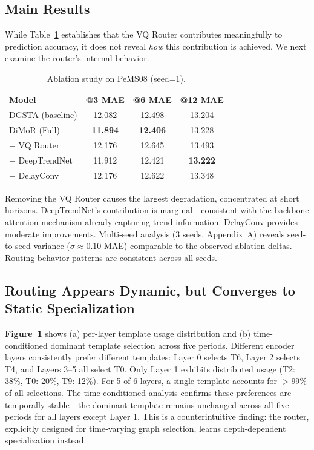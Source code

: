\documentclass[journal]{IEEEtran}
\begin{document}
\subsection{Main Results}

While Table~\ref{tab:ablation} establishes that the VQ Router contributes meaningfully to prediction accuracy, it does not reveal \emph{how} this contribution is achieved. We next examine the router's internal behavior.

\begin{table}[h]
\centering
\caption{Ablation study on PeMS08 (seed=1).}
\label{tab:ablation}
\begin{tabular}{lccc}
\toprule
Model & @3 MAE & @6 MAE & @12 MAE \\
\midrule
DGSTA (baseline) & 12.082 & 12.498 & 13.204 \\
DiMoR (Full) & \textbf{11.894} & \textbf{12.406} & 13.228 \\
$-$ VQ Router & 12.176 & 12.645 & 13.493 \\
$-$ DeepTrendNet & 11.912 & 12.421 & \textbf{13.222} \\
$-$ DelayConv & 12.176 & 12.622 & 13.348 \\
\bottomrule
\end{tabular}
\end{table}

Removing the VQ Router causes the largest degradation, concentrated at short horizons. DeepTrendNet's contribution is marginal---consistent with the backbone attention mechanism already capturing trend information. DelayConv provides moderate improvements. Multi-seed analysis (3 seeds, Appendix~A) reveals seed-to-seed variance ($\sigma\approx 0.10$ MAE) comparable to the observed ablation deltas. Routing behavior patterns are consistent across all seeds.

\subsection{Routing Appears Dynamic, but Converges to Static Specialization}

\textbf{Figure~1} shows (a) per-layer template usage distribution and (b) time-conditioned dominant template selection across five periods. Different encoder layers consistently prefer different templates: Layer 0 selects T6, Layer 2 selects T4, and Layers 3--5 all select T0. Only Layer 1 exhibits distributed usage (T2: 38\%, T0: 20\%, T9: 12\%). For 5 of 6 layers, a single template accounts for $>$99\% of all selections. The time-conditioned analysis confirms these preferences are temporally stable---the dominant template remains unchanged across all five periods for all layers except Layer 1. This is a counterintuitive finding: the router, explicitly designed for time-varying graph selection, learns depth-dependent specialization instead.
\end{document}
